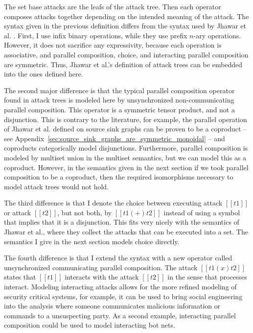 The set base attacks are the leafs of the attack tree.  Then each
operator composes attacks together depending on the intended meaning
of the attack. The syntax given in the previous definition differs
from the syntax used by Jhawar et al. \cite{Jhawar:2015}.  First, I
use infix binary operations, while they use prefix $n$-ary
operations. However, it does not sacrifice any expressivity, because
each operation is associative, and parallel composition, choice, and
interacting parallel composition are symmetric.  Thus, Jhawar et al.'s
definition of attack trees can be embedded into the ones defined
here.%

The second major difference is that the typical parallel composition
operator found in attack trees is modeled here by unsynchronized
non-communicating parallel composition.  This operator is a symmetric
tensor product, and not a disjunction.  This is contrary to the
literature, for example, the parallel operation of Jhawar et
al. defined on source sink graphs \cite{Jhawar:2015} can be proven to
be a coproduct -- see
Appendix~\ref{sec:source_sink_graphs_are_symmetric_monoidal} -- and
coproducts categorically model disjunctions.  Furthermore, parallel
composition is modeled by multiset union in the multiset semantics,
but we can model this as a coproduct.  However, in the semantics given
in the next section if we took parallel composition to be a coproduct,
then the required isomorphisms necessary to model attack trees would
not hold.

The third difference is that I denote the choice between executing
attack $[[t1]]$ or attack $[[t2]]$, but not both, by $[[t1 (+) t2]]$
instead of using a symbol that implies that it is a disjunction.  This
fits very nicely with the semantics of Jhawar et al., where they
collect the attacks that can be executed into a set.  The semantics I
give in the next section models choice directly.

The fourth difference is that I extend the syntax with a new operator
called unsynchronized communicating parallel composition.  The attack
$[[t1 (x) t2]]$ states that $[[t1]]$ interacts with the attack
$[[t2]]$ in the sense that processes interact.  Modeling interacting
attacks allows for the more refined modeling of security critical
systems, for example, it can be used to bring social engineering into
the analysis where someone communicates malicious information or
commands to a unsuspecting party.  As a second example, interacting
parallel composition could be used to model interacting bot nets.

